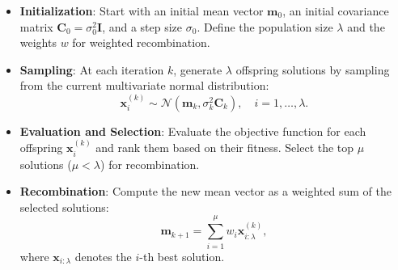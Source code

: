 \begin{itemize}
    \item \textbf{Initialization}: Start with an initial mean vector \(\mathbf{m}_0\), an initial covariance matrix \(\mathbf{C}_0 = \sigma_0^2 \mathbf{I}\), and a step size \(\sigma_0\). Define the population size \(\lambda\) and the weights $w$ for weighted recombination.
    
    \item \textbf{Sampling}: At each iteration \(k\), generate \(\lambda\) offspring solutions by sampling from the current multivariate normal distribution:
    \begin{equation}
    \mathbf{x}_i^{(k)} \sim \mathcal{N}(\mathbf{m}_k, \sigma_k^2 \mathbf{C}_k), \quad i = 1, \dots, \lambda.
    \end{equation}
    
    \item \textbf{Evaluation and Selection}: Evaluate the objective function for each offspring \(\mathbf{x}_i^{(k)}\) and rank them based on their fitness. Select the top \(\mu\) solutions (\(\mu < \lambda\)) for recombination.
    
    \item \textbf{Recombination}: Compute the new mean vector as a weighted sum of the selected solutions:
    \begin{equation}
    \mathbf{m}_{k+1} = \sum_{i=1}^\mu w_i \mathbf{x}_{i:\lambda}^{(k)},
    \end{equation}
    where \(\mathbf{x}_{i:\lambda}\) denotes the \(i\)-th best solution.
    

\end{itemize}
